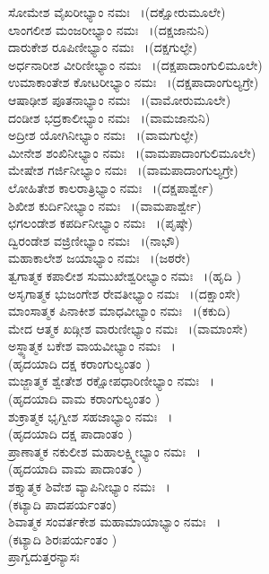   ಸೋಮೇಶ ವೈಖರೀಭ್ಯಾಂ ನಮಃ  ~।(ದಕ್ಷೋರುಮೂಲೇ)\\
  ಲಾಂಗಲೀಶ ಮಂಜರೀಭ್ಯಾಂ ನಮಃ  ~।(ದಕ್ಷಜಾನುನಿ)\\
  ದಾರುಕೇಶ ರೂಪಿಣೀಭ್ಯಾಂ ನಮಃ  ~।(ದಕ್ಷಗುಲ್ಫೇ)\\
  ಅರ್ಧನಾರೀಶ ವೀರಿಣೀಭ್ಯಾಂ ನಮಃ  ~।(ದಕ್ಷಪಾದಾಂಗುಲಿಮೂಲೇ)\\
  ಉಮಾಕಾಂತೇಶ ಕೋಟರೀಭ್ಯಾಂ ನಮಃ  ~।(ದಕ್ಷಪಾದಾಂಗುಲ್ಯಗ್ರೇ)\\
  ಆಷಾಢೀಶ ಪೂತನಾಭ್ಯಾಂ ನಮಃ  ~।(ವಾಮೋರುಮೂಲೇ)\\
  ದಂಡೀಶ ಭದ್ರಕಾಲೀಭ್ಯಾಂ ನಮಃ  ~।(ವಾಮಜಾನುನಿ)\\
  ಅದ್ರೀಶ ಯೋಗಿನೀಭ್ಯಾಂ ನಮಃ  ~।(ವಾಮಗುಲ್ಫೇ)\\
  ಮೀನೇಶ ಶಂಖಿನೀಭ್ಯಾಂ ನಮಃ  ~।(ವಾಮಪಾದಾಂಗುಲಿಮೂಲೇ)\\
  ಮೇಷೇಶ ಗರ್ಜಿನೀಭ್ಯಾಂ ನಮಃ  ~।(ವಾಮಪಾದಾಂಗುಲ್ಯಗ್ರೇ)\\
  ಲೋಹಿತೇಶ ಕಾಲರಾತ್ರಿಭ್ಯಾಂ ನಮಃ  ~।(ದಕ್ಷಪಾರ್ಶ್ವೇ)\\
  ಶಿಖೀಶ ಕುರ್ದಿನೀಭ್ಯಾಂ ನಮಃ  ~।(ವಾಮಪಾರ್ಶ್ವೇ)\\
  ಛಗಲಂಡೇಶ ಕಪರ್ದಿನೀಭ್ಯಾಂ ನಮಃ  ~।(ಪೃಷ್ಠೇ)\\
  ದ್ವಿರಂಡೇಶ ವಜ್ರಿಣೀಭ್ಯಾಂ ನಮಃ  ~।(ನಾಭೌ)\\
  ಮಹಾಕಾಲೇಶ ಜಯಾಭ್ಯಾಂ ನಮಃ  ~।(ಜಠರೇ)\\
  ತ್ವಗಾತ್ಮಕ ಕಪಾಲೀಶ ಸುಮುಖೇಶ್ವರೀಭ್ಯಾಂ ನಮಃ  ~।(ಹೃದಿ )\\
  ಅಸೃಗಾತ್ಮಕ ಭುಜಂಗೇಶ ರೇವತೀಭ್ಯಾಂ ನಮಃ  ~।(ದಕ್ಷಾಂಸೇ)\\
  ಮಾಂಸಾತ್ಮಕ ಪಿನಾಕೀಶ ಮಾಧವೀಭ್ಯಾಂ ನಮಃ  ~।(ಕಕುದಿ)\\
  ಮೇದ ಆತ್ಮಕ ಖಡ್ಗೀಶ ವಾರುಣೀಭ್ಯಾಂ ನಮಃ  ~।(ವಾಮಾಂಸೇ)\\
  ಅಸ್ಥ್ಯಾತ್ಮಕ ಬಕೇಶ ವಾಯವೀಭ್ಯಾಂ ನಮಃ  ~।\\(ಹೃದಯಾದಿ ದಕ್ಷ ಕರಾಂಗುಲ್ಯಂತಂ )\\
  ಮಜ್ಜಾತ್ಮಕ ಶ್ವೇತೇಶ ರಕ್ಷೋಪಧಾರಿಣೀಭ್ಯಾಂ ನಮಃ  ~।\\(ಹೃದಯಾದಿ ವಾಮ ಕರಾಂಗುಲ್ಯಂತಂ )\\
  ಶುಕ್ರಾತ್ಮಕ ಭೃಗ್ವೀಶ ಸಹಜಾಭ್ಯಾಂ ನಮಃ  ~।\\(ಹೃದಯಾದಿ ದಕ್ಷ ಪಾದಾಂತಂ )\\
  ಪ್ರಾಣಾತ್ಮಕ ನಕುಲೀಶ ಮಹಾಲಕ್ಷ್ಮೀಭ್ಯಾಂ ನಮಃ  ~।\\(ಹೃದಯಾದಿ ವಾಮ ಪಾದಾಂತಂ )\\
  ಶಕ್ತ್ಯಾತ್ಮಕ ಶಿವೇಶ ವ್ಯಾಪಿನೀಭ್ಯಾಂ ನಮಃ  ~।\\(ಕಟ್ಯಾದಿ ಪಾದಪರ್ಯಂತಂ)\\
 ಶಿವಾತ್ಮಕ ಸಂವರ್ತಕೇಶ ಮಹಾಮಾಯಾಭ್ಯಾಂ ನಮಃ  ~।\\(ಕಟ್ಯಾದಿ ಶಿರಃಪರ್ಯಂತಂ )\\
ಪ್ರಾಗ್ವದುತ್ತರನ್ಯಾಸಃ

